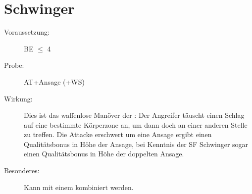 \section{Schwinger}
\label{uAT.schwinger}
\begin{description}
    \item[Voraussetzung:]
        BE\textrm{ ${\leq}$ }4
    \item[Probe:]
        AT+Ansage (+WS)
    \item[Wirkung:]
        Dies ist das waffenlose Manöver der :
        Der Angreifer täuscht einen Schlag auf eine bestimmte Körperzone an, um dann doch an einer anderen Stelle zu treffen.
        Die Attacke erschwert um eine Ansage ergibt einen Qualitätsbonus in Höhe der Ansage, bei Kenntnis der SF Schwinger sogar einen Qualitätsbonus in Höhe der doppelten Ansage.
    \item[Besonderes:]
        Kann mit einem  kombiniert werden.
\end{description}
